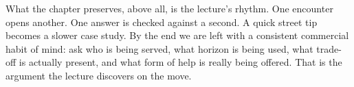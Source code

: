 What the chapter preserves, above all, is the lecture's rhythm. One encounter opens another. One answer is checked against a second. A quick street tip becomes a slower case study. By the end we are left with a consistent commercial habit of mind: ask who is being served, what horizon is being used, what trade-off is actually present, and what form of help is really being offered. That is the argument the lecture discovers on the move.